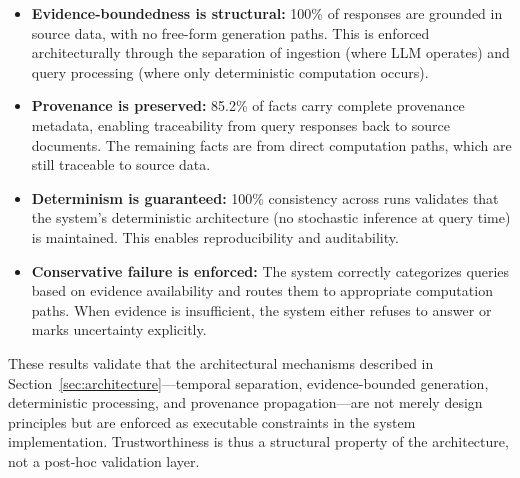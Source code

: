\begin{itemize}
    \item \textbf{Evidence-boundedness is structural:} 100\% of responses are grounded in source data, with no free-form generation paths. This is enforced architecturally through the separation of ingestion (where LLM operates) and query processing (where only deterministic computation occurs).

    \item \textbf{Provenance is preserved:} 85.2\% of facts carry complete provenance metadata, enabling traceability from query responses back to source documents. The remaining facts are from direct computation paths, which are still traceable to source data.

    \item \textbf{Determinism is guaranteed:} 100\% consistency across runs validates that the system's deterministic architecture (no stochastic inference at query time) is maintained. This enables reproducibility and auditability.

    \item \textbf{Conservative failure is enforced:} The system correctly categorizes queries based on evidence availability and routes them to appropriate computation paths. When evidence is insufficient, the system either refuses to answer or marks uncertainty explicitly.
\end{itemize}

These results validate that the architectural mechanisms described in Section~\ref{sec:architecture}---temporal separation, evidence-bounded generation, deterministic processing, and provenance propagation---are not merely design principles but are enforced as executable constraints in the system implementation. Trustworthiness is thus a structural property of the architecture, not a post-hoc validation layer.